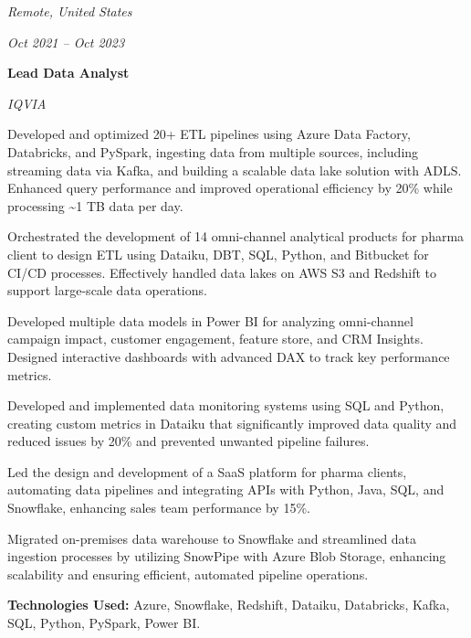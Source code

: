

    \begin{twocolentry}{
        \textit{Remote, United States}    
    
        \textit{Oct 2021 – Oct 2023}}
        \textbf{Lead Data Analyst}
        
        \textit{IQVIA}
    \end{twocolentry}
    


    \vspace{0.10 cm}
    \begin{onecolentry}
        \begin{highlights}
            \item Developed and optimized 20+ ETL pipelines using Azure Data Factory, Databricks, and PySpark, ingesting data from multiple sources, including streaming data via Kafka, and building a scalable data lake solution with ADLS. Enhanced query performance and improved operational efficiency by 20\% while processing \textasciitilde 1 TB data per day.
            \item Orchestrated the development of 14 omni-channel analytical products for pharma client to design ETL using Dataiku, DBT, SQL, Python, and Bitbucket for CI/CD processes. Effectively handled data lakes on AWS S3 and Redshift to support large-scale data operations.
            \item Developed multiple data models in Power BI for analyzing omni-channel campaign impact, customer engagement, feature store, and CRM Insights. Designed interactive dashboards with advanced DAX to track key performance metrics.
            \item Developed and implemented data monitoring systems using SQL and Python, creating custom metrics in Dataiku that significantly improved data quality and reduced issues by 20\% and prevented unwanted pipeline failures.
            \item Led the design and development of a SaaS platform for pharma clients, automating data pipelines and integrating APIs with Python, Java, SQL, and Snowflake, enhancing sales team performance by 15\%. 
            \item Migrated on-premises data warehouse to Snowflake and streamlined data ingestion processes by utilizing SnowPipe with Azure Blob Storage, enhancing scalability and ensuring efficient, automated pipeline operations. 
            
            \textbf{Technologies Used:} Azure, Snowflake, Redshift, Dataiku, Databricks, Kafka, SQL, Python, PySpark, Power BI.
        \end{highlights}
    \end{onecolentry}



